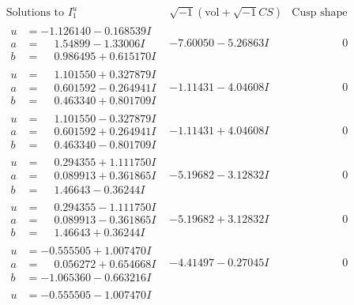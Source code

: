 \documentclass[1p]{elsarticle_modified}
\theoremstyle{definition}
\newcommand{\I}{\sqrt{-1}}
\begin{document}
$$\begin{array}{c|c|c}
\text{Solutions to }I^u_{1}& \I (\text{vol} + \sqrt{-1}CS) & \text{Cusp shape}\\
 \hline 
\begin{aligned}
u &= -1.126140 - 0.168539 I \\
a &= \phantom{-}1.54899 - 1.33006 I \\
b &= \phantom{-}0.986495 + 0.615170 I\end{aligned}
 & -7.60050 - 5.26863 I & \phantom{-0.000000 } 0 \\ \hline\begin{aligned}
u &= \phantom{-}1.101550 + 0.327879 I \\
a &= \phantom{-}0.601592 - 0.264941 I \\
b &= \phantom{-}0.463340 + 0.801709 I\end{aligned}
 & -1.11431 - 4.04608 I & \phantom{-0.000000 } 0 \\ \hline\begin{aligned}
u &= \phantom{-}1.101550 - 0.327879 I \\
a &= \phantom{-}0.601592 + 0.264941 I \\
b &= \phantom{-}0.463340 - 0.801709 I\end{aligned}
 & -1.11431 + 4.04608 I & \phantom{-0.000000 } 0 \\ \hline\begin{aligned}
u &= \phantom{-}0.294355 + 1.111750 I \\
a &= \phantom{-}0.089913 + 0.361865 I \\
b &= \phantom{-}1.46643 - 0.36244 I\end{aligned}
 & -5.19682 - 3.12832 I & \phantom{-0.000000 } 0 \\ \hline\begin{aligned}
u &= \phantom{-}0.294355 - 1.111750 I \\
a &= \phantom{-}0.089913 - 0.361865 I \\
b &= \phantom{-}1.46643 + 0.36244 I\end{aligned}
 & -5.19682 + 3.12832 I & \phantom{-0.000000 } 0 \\ \hline\begin{aligned}
u &= -0.555505 + 1.007470 I \\
a &= \phantom{-}0.056272 + 0.654668 I \\
b &= -1.065360 - 0.663216 I\end{aligned}
 & -4.41497 - 0.27045 I & \phantom{-0.000000 } 0 \\ \hline\begin{aligned}
u &= -0.555505 - 1.007470 I \\

\end{aligned}
\end{array}$$
\end{document}
